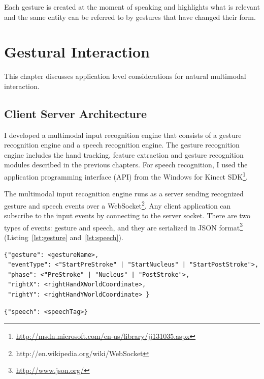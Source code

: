 \begin{savequote}[120mm]
Each gesture is created at the moment of speaking and highlights what is
relevant and the same entity can be referred to by gestures that have changed
their form.
\end{savequote}
\chapter{Gestural Interaction}
This chapter discusses application level considerations for natural multimodal
interaction.

\section{Client Server Architecture}
I developed a multimodal input recognition engine that consists of a gesture
recognition engine and a speech recognition engine. The gesture recognition
engine includes the hand tracking, feature extraction and gesture recognition
modules described in the previous chapters.
For speech recognition, I used the application programming interface (API) from
the Windows for Kinect SDK\footnote{\url{http://msdn.microsoft.com/en-us/library/jj131035.aspx}}.

The multimodal input recognition engine runs as a server sending recognized
gesture and speech events over a WebSocket\footnote{http://en.wikipedia.org/wiki/WebSocket}. Any client
application can subscribe to the input events by connecting to the server
socket. There are two types of events: gesture and speech, and they are
serialized in JSON format\footnote{\url{http://www.json.org/}}
(Listing~\ref{lst:gesture} and~\ref{lst:speech}).

\begin{lstlisting}[caption={Gesture event JSON object}, label={lst:gesture}]
{"gesture": <gestureName>, 
 "eventType": <"StartPreStroke" | "StartNucleus" | "StartPostStroke">,
 "phase": <"PreStroke" | "Nucleus" | "PostStroke">,
 "rightX": <rightHandXWorldCoordinate>,
 "rightY": <rightHandYWorldCoordinate> } 
\end{lstlisting}

\begin{lstlisting}[caption={Speech event JSON object}, label={lst:speech}]
{"speech": <speechTag>}
\end{lstlisting}

